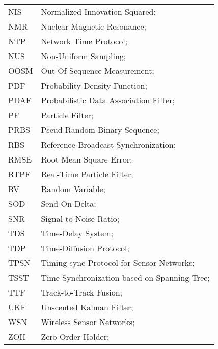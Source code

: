 \begin{longtable}{ll}
	NIS			& Normalized Innovation Squared; \\
	NMR 		& Nuclear Magnetic Resonance; \\
	NTP			& Network Time Protocol; \\
	NUS 		& Non-Uniform Sampling; \\ 
	OOSM 		& Out-Of-Sequence Measurement; \\
	PDF         & Probability Density Function; \\
	PDAF		& Probabilistic Data Association Filter; \\
	PF 			& Particle Filter; \\
	PRBS		& Pseud-Random Binary Sequence; \\
	RBS			& Reference Broadcast Synchronization; \\
	RMSE		& Root Mean Square Error; \\
	RTPF		& Real-Time Particle Filter; \\
	RV			& Random Variable; \\
	SOD			& Send-On-Delta; \\
	SNR			& Signal-to-Noise Ratio; \\
	TDS			& Time-Delay System; \\
	TDP			& Time-Diffusion Protocol; \\
	TPSN		& Timing-sync Protocol for Sensor Networks; \\
	TSST		& Time Synchronization based on Spanning Tree; \\
	TTF 		& Track-to-Track Fusion; \\
	UKF			& Unscented Kalman Filter; \\
	WSN			& Wireless Sensor Networks; \\
	ZOH			& Zero-Order Holder; \\
\end{longtable}

